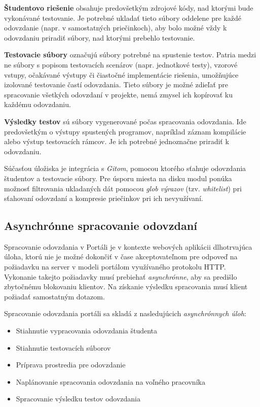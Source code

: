 \documentclass[
  digital, %
  twoside, %
  table,   %
  lof,     %
  lot,     %
]{fithesis3}
\begin{document}
\textbf{Študentovo riešenie} obsahuje predovšetkým zdrojové kódy, nad ktorými bude vykonávané testovanie. Je potrebné ukladať tieto súbory oddelene pre každé odovzdanie (napr. v samostatných priečinkoch), aby bolo možné vždy k odovzdaniu priradiť súbory, nad ktorými prebehlo testovanie.

\textbf{Testovacie súbory} označujú súbory potrebné na spustenie testov. Patria medzi ne súbory s popisom testovacích scenárov (napr. jednotkové testy), vzorové vstupy, očakávané výstupy či čiastočné implementácie riešenia, umožňujúce izolované testovanie častí odovzdania. Tieto súbory je možné zdieľať pre spracovanie všetkých odovzdaní v projekte, nemá zmysel ich kopírovať ku každému odovzdaniu.

\textbf{Výsledky testov} sú súbory vygenerované počas spracovania odovzdania. Ide predovšetkým o výstupy spustených programov, napríklad záznam kompilácie alebo výstup testovacích rámcov. Je ich potrebné jednoznačne priradiť k odovzdaniu.

Súčasťou úložiska je integrácia s \emph{Gitom}, pomocou ktorého sťahuje odovzdania študentov a testovacie súbory. Pre úsporu miesta na disku modul ponúka možnosť filtrovania ukladaných dát pomocou \emph{glob výrazov} (tzv. \emph{whitelist}) pri sťahovaní odovzdaní a kompresie priečinkov pri ich nevyužívaní.

\subsection{Asynchrónne spracovanie odovzdaní}
\label{design-async-process}

Spracovanie odovzdania v Portáli je v kontexte webových aplikácii dlhotrvajúca úloha, ktorú nie je možné dokončiť v čase akceptovateľnom pre odpoveď na požiadavku na server v modeli portálom využívaného protokolu HTTP. Vykonanie takejto požiadavky musí prebiehať \emph{asynchrónne}, aby sa predišlo zbytočnému blokovaniu klientov. Na získanie výsledku spracovania musí klient požiadať samostatným dotazom.

Spracovanie odovzdania portáli sa skladá z nasledujúcich \emph{asynchrónnych úloh}:
\begin{itemize}
    \item Stiahnutie vypracovania odovzdania študenta
    \item Stiahnutie testovacích súborov
    \item Príprava prostredia pre odovzdanie
    \item Naplánovanie spracovania odovzdania na voľného pracovníka
    \item Spracovanie výsledku testov odovzdania
\end{itemize}
\end{document}
